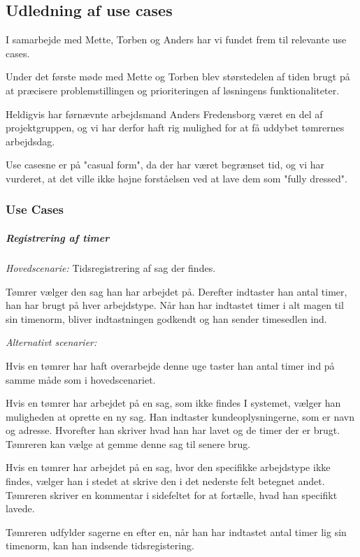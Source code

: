 \subsection{Udledning af use cases}\label{ssec:usecase}

I samarbejde med Mette, Torben og Anders har vi fundet frem til relevante use cases.

Under det første møde med Mette og Torben blev størstedelen af tiden brugt på at præcisere problemstillingen og prioriteringen af løsningens funktionaliteter.

Heldigvis har førnævnte arbejdsmand Anders Fredensborg været en del af projektgruppen, og vi har derfor haft rig mulighed for at få uddybet tømrernes arbejdsdag.

Use casesne er på "casual form", da der har været begrænset tid, og vi har vurderet, at det ville ikke højne forståelsen ved at lave dem som "fully dressed".\cite{larman}

\subsubsection{Use Cases}

\subparagraph{Registrering af timer}

\textit{Hovedscenarie:} Tidsregistrering af sag der findes.

Tømrer vælger den sag han har arbejdet på. Derefter indtaster han antal timer, han har brugt på hver arbejdstype. Når han har indtastet timer i alt magen til sin timenorm, bliver indtastningen godkendt og han sender timesedlen ind.

\textit{Alternativt scenarier: }

Hvis en tømrer har haft overarbejde denne uge taster han antal timer ind på samme måde som i hovedscenariet.

Hvis en tømrer har arbejdet på en sag, som ikke findes I systemet, vælger han muligheden at oprette en ny sag.
Han indtaster kundeoplysningerne, som er navn og adresse.
Hvorefter han skriver hvad han har lavet og de timer der er brugt.
Tømreren kan vælge at gemme denne sag til senere brug.

Hvis en tømrer har arbejdet på en sag, hvor den specifikke arbejdstype ikke findes, vælger han i stedet at skrive den i det nederste felt betegnet andet.
Tømreren skriver en kommentar i sidefeltet for at fortælle, hvad han specifikt lavede.

Tømreren udfylder sagerne en efter en, når han har indtastet antal timer lig sin timenorm, kan han indsende tidsregistering.

